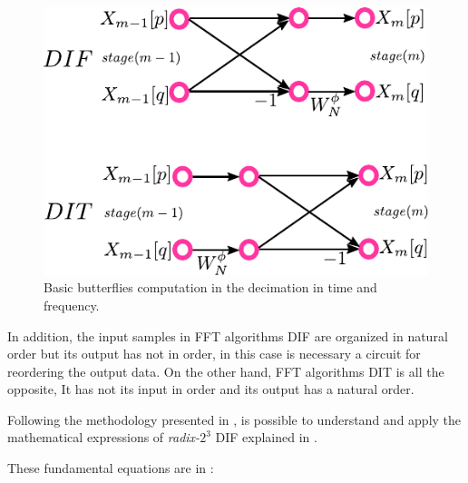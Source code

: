 \documentclass[journal,comsoc]{IEEEtran}
\begin{document}
\begin{figure} 
	\centering
	\includegraphics[width=0.65\linewidth]{Diagramas/miSeccionFiguras/DifDit.pdf}
	\caption{Basic butterflies computation in the decimation in time and frequency.}
	\label{fig:difdit}
\end{figure}

In addition, the input samples in FFT algorithms DIF are organized in natural order but its output has not in order, in this case is necessary a circuit for reordering the output data. On the other hand, FFT algorithms DIT is all the  opposite, It has not its input in order and its output has a natural order.

Following the methodology presented in \cite{proakis_digital_nodate}, is possible to understand and apply the mathematical expressions of \textit{radix-}$2^3$ DIF explained in \cite{jia_efficient_nodate}. 


These fundamental equations are in :

\end{document}
